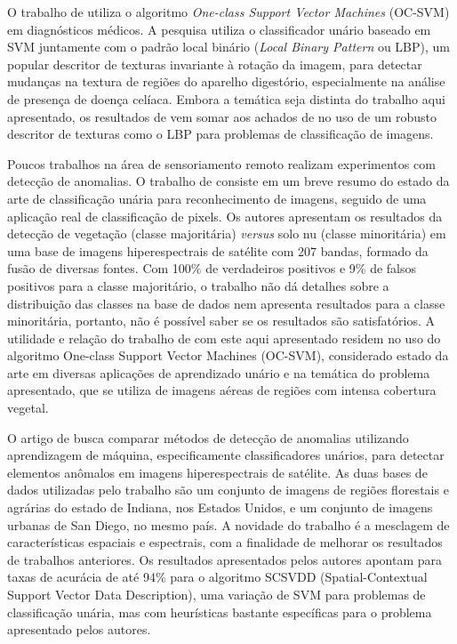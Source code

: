 O trabalho de  utiliza o algoritmo \textit{One-class Support Vector Machines} (OC-SVM) em diagnósticos médicos. A pesquisa utiliza o classificador unário baseado em SVM juntamente com o padrão local binário (\textit{Local Binary Pattern} ou LBP), um popular descritor de texturas invariante à rotação da imagem, para detectar mudanças na textura de regiões do aparelho digestório, especialmente na análise de presença de doença celíaca. Embora a temática seja distinta do trabalho aqui apresentado,  os resultados de  vem somar aos achados de  no uso de um robusto descritor de texturas como o LBP para problemas de classificação de imagens.

Poucos trabalhos na área de sensoriamento remoto realizam experimentos com detecção de anomalias. O trabalho de  consiste em um breve resumo do estado da arte de classificação unária para reconhecimento de imagens, seguido de uma aplicação real de classificação de pixels. Os autores apresentam os resultados da detecção de vegetação (classe majoritária) \textit{versus} solo nu (classe minoritária) em uma base de imagens hiperespectrais de satélite com 207 bandas, formado da fusão de diversas fontes. Com 100\% de verdadeiros positivos e 9\% de falsos positivos para a classe majoritário, o trabalho não dá detalhes sobre a distribuição das classes na base de dados nem apresenta resultados para a classe minoritária, portanto, não é possível saber se os resultados são satisfatórios. A utilidade e relação do trabalho de  com este aqui apresentado residem no uso do algoritmo One-class Support Vector Machines (OC-SVM), considerado estado da arte em diversas aplicações de aprendizado unário e na temática do problema apresentado, que se utiliza de imagens aéreas de regiões com intensa cobertura vegetal.

O artigo de  busca comparar métodos de detecção de anomalias utilizando aprendizagem de máquina, especificamente classificadores unários, para detectar elementos anômalos em imagens hiperespectrais de satélite. As duas bases de dados utilizadas pelo trabalho são um conjunto de imagens de regiões florestais e agrárias do estado de Indiana, nos Estados Unidos, e um conjunto de imagens urbanas de San Diego, no mesmo país. A novidade do trabalho é a mesclagem de características espaciais e espectrais, com a finalidade de melhorar os resultados de trabalhos anteriores. Os resultados apresentados pelos autores apontam para taxas de acurácia de até 94\% para o algoritmo SCSVDD (Spatial-Contextual Support Vector Data Description), uma variação de SVM para problemas de classificação unária, mas com heurísticas bastante específicas para o problema apresentado pelos autores.

